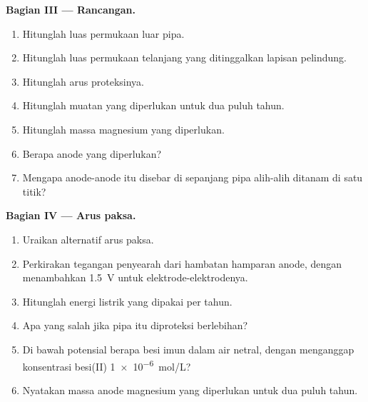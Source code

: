 \begin{problem}
\medskip
\noindent\textbf{Bagian III --- Rancangan.}
\begin{enumerate}[resume]
  \item Hitunglah luas permukaan luar pipa.
  \item Hitunglah luas permukaan telanjang yang ditinggalkan lapisan
        pelindung.
  \item Hitunglah arus proteksinya.
  \item Hitunglah muatan yang diperlukan untuk dua puluh tahun.
  \item Hitunglah massa magnesium yang diperlukan.
  \item Berapa anode yang diperlukan?
  \item Mengapa anode-anode itu disebar di sepanjang pipa alih-alih ditanam
        di satu titik?
\end{enumerate}

\medskip
\noindent\textbf{Bagian IV --- Arus paksa.}
\begin{enumerate}[resume]
  \item Uraikan alternatif arus paksa.
  \item Perkirakan tegangan penyearah dari hambatan hamparan anode, dengan
        menambahkan \qty{1.5}{V} untuk elektrode-elektrodenya.
  \item Hitunglah energi listrik yang dipakai per tahun.
  \item Apa yang salah jika pipa itu diproteksi berlebihan?
  \item Di bawah potensial berapa besi imun dalam air netral, dengan
        menganggap konsentrasi besi(II) \qty{1e-6}{mol/L}?
  \item Nyatakan massa anode magnesium yang diperlukan untuk dua puluh
        tahun.
\end{enumerate}
\end{problem}
